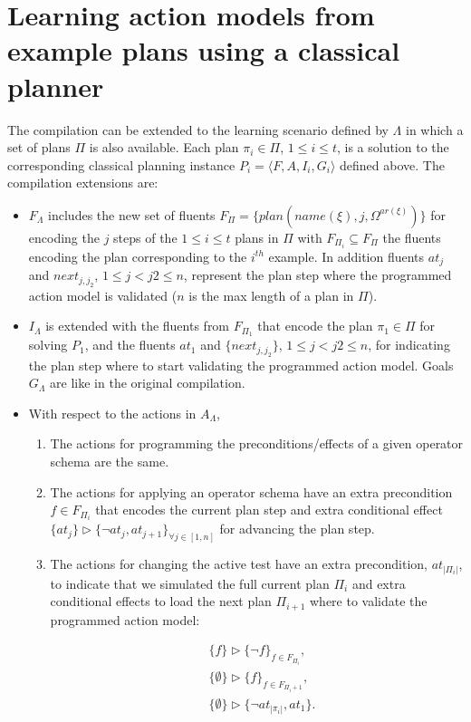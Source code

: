\documentclass[letterpaper]{article} %
\newcommand{\tup}[1]{{\langle #1 \rangle}}
\begin{document}
\section{Learning action models from example plans using a classical planner}
The compilation can be extended to the learning scenario defined by $\Lambda$ in which a set of plans $\Pi$ is also available. Each plan $\pi_i\in \Pi$, {\small $1\leq i\leq t$}, is a solution to the corresponding classical planning instance $P_i=\tup{F,A,I_i,G_i}$ defined above. The compilation extensions are: 
\begin{itemize}
\item $F_{\Lambda}$ includes the new set of fluents $F_{\Pi}=\{plan(name(\xi),j,\Omega^{ar(\xi)})\}$ for encoding the $j$ steps of the {\small $1\leq i\leq t$} plans in $\Pi$ with $F_{\Pi_i}\subseteq F_{\Pi}$ the fluents encoding the plan corresponding to the $i^{th}$ example. In addition fluents $at_j$ and $next_{j,j_2}$, {\small $1\leq j<j2\leq n$}, represent the plan step where the programmed action model is validated ($n$ is the max length of a plan in $\Pi$).
\item $I_{\Lambda}$ is extended with the fluents from $F_{\Pi_1}$ that encode the plan $\pi_1\in \Pi$ for solving $P_1$, and the fluents $at_1$ and $\{next_{j,j_2}\}$, {\small $1\leq j<j2\leq n$}, for indicating the plan step where to start validating the programmed action model. Goals $G_{\Lambda}$ are like in the original compilation.
\item With respect to the actions in $A_{\Lambda}$,
\begin{enumerate}
\item The actions for programming the preconditions/effects of a given operator schema are the same.
\item The actions for applying an operator schema have an extra precondition $f\in F_{\Pi_i}$ that encodes the current plan step and extra conditional effect $\{at_{j}\}\rhd\{\neg at_{j},at_{j+1}\}_{\forall j\in [1,n]}$ for advancing the plan step.
\item The actions for changing the active test have an extra precondition, $at_{|\Pi_i|}$, to indicate that we simulated the full current plan $\Pi_i$ and extra conditional effects to load the next plan $\Pi_{i+1}$ where to validate the programmed action model:
\begin{small}
\begin{align*}
&\{f\}\rhd\{\neg f\}_{f\in F_{\Pi_i}},\\
&\{\emptyset\}\rhd\{f\}_{f\in F_{\Pi_i+1}},\\
&\{\emptyset\}\rhd\{\neg at_{|\pi_i|},at_1\}.
\end{align*}
\end{small}
\end{enumerate}
\end{itemize}
\end{document}
